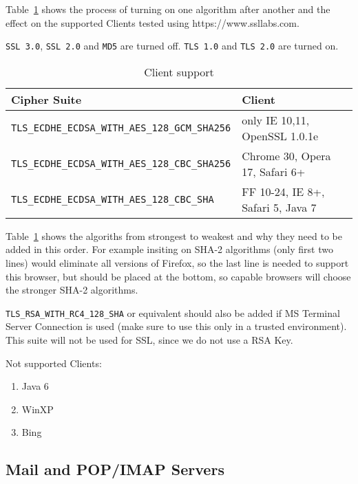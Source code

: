 Table~\ref{tab:MS_IIS_Client_Support} shows the process of turning on
one algorithm after another and the effect on the supported Clients
tested using https://www.ssllabs.com.

\verb|SSL 3.0|, \verb|SSL 2.0| and \verb|MD5| are turned off.
\verb|TLS 1.0| and \verb|TLS 2.0| are turned on.

\begin{table}[h]
  \centering
  \small
  \begin{tabular}{|l|l|}
    \hline
    Cipher Suite & Client \\
    \hline
    \verb|TLS_ECDHE_ECDSA_WITH_AES_128_GCM_SHA256| & only IE 10,11, OpenSSL 1.0.1e \\
    \hline
    \verb|TLS_ECDHE_ECDSA_WITH_AES_128_CBC_SHA256| & Chrome 30, Opera 17, Safari 6+ \\
    \hline
    \verb|TLS_ECDHE_ECDSA_WITH_AES_128_CBC_SHA| & FF 10-24, IE 8+, Safari 5, Java 7\\
    \hline
  \end{tabular}
  \caption{Client support}
  \label{tab:MS_IIS_Client_Support}
\end{table}

Table~\ref{tab:MS_IIS_Client_Support} shows the algoriths from
strongest to weakest and why they need to be added in this order. For
example insiting on SHA-2 algorithms (only first two lines) would
eliminate all versions of Firefox, so the last line is needed to
support this browser, but should be placed at the bottom, so capable
browsers will choose the stronger SHA-2 algorithms.

\verb|TLS_RSA_WITH_RC4_128_SHA| or equivalent should also be added if
MS Terminal Server Connection is used (make sure to use this only in a
trusted environment). This suite will not be used for SSL, since we do
not use a RSA Key.




Not supported Clients:
\begin{enumerate}
\item Java 6
\item WinXP
\item Bing
\end{enumerate}


\subsection{Mail and POP/IMAP Servers}
